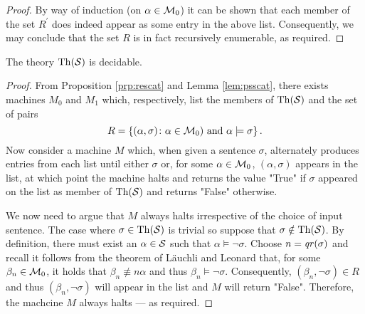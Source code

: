\begin{proof}
	By way of induction (on $\alpha\in\mathcal{M}_0$) it can be shown that each member of the set $R^\prime$ does indeed appear as some entry in the above list.  Consequently, we may conclude that the set $R$ is in fact recursively enumerable, as required.
\end{proof}

\begin{thm}
	The theory $\operatorname{Th}(\mathcal{S})$ is decidable.
\end{thm}
\begin{proof}
	From Proposition \ref{prp:rescat} and Lemma \ref{lem:psscat}, there exists machines $M_0$ and $M_1$ which, respectively, list the members of $\operatorname{Th}(\mathcal{S})$ and the set of pairs
	\begin{equation}
		R=\left\lbrace (\alpha,\sigma)\colon \alpha\in\mathcal{M}_0)\text{ and }\alpha\models\sigma \right\rbrace.
	\end{equation}
	Now consider a machine $M$ which, when given a sentence $\sigma$, alternately produces entries from each list until either $\sigma$ or, for some $\alpha\in\mathcal{M}_0$, $(\alpha,\sigma)$ appears in the list, at which point the machine halts and returns the value "True" if $\sigma$ appeared on the list as member of $\operatorname{Th}(\mathcal{S})$ and returns "False" otherwise.

	We now need to argue that $M$ always halts irrespective of the choice of input sentence.  The case where $\sigma\in\operatorname{Th}(\mathcal{S})$ is trivial so suppose that $\sigma\notin\operatorname{Th}(\mathcal{S})$.  By definition, there must exist an $\alpha\in\mathcal{S}$ such that $\alpha\models\neg\sigma$.  Choose $n=\mathit{qr}(\sigma)$ and recall it follows from the theorem of L\"auchli and Leonard that, for some $\beta_n\in\mathcal{M}_0$, it holds that $\beta_n\nequiv{n}\alpha$ and thus $\beta_n\models\neg\sigma$.  Consequently, $(\beta_n,\neg\sigma)\in R$ and thus $(\beta_n,\neg\sigma)$ will appear in the list and $M$ will return "False".  Therefore, the machcine $M$ always halts --- as required.
\end{proof}
